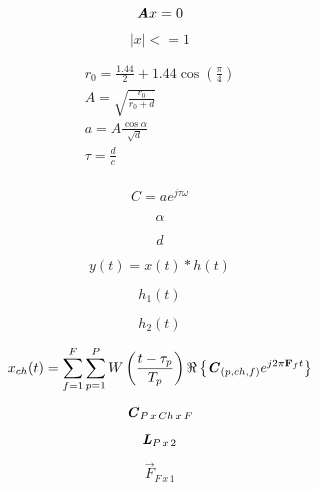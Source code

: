 \documentclass[10pt]{report}
\begin{document}
	
\begin{equation*}
\bm{\mathit{A}}x = 0
\end{equation*}

\begin{equation*}
|x| <= 1
\end{equation*}

\begin{gather*}
	r_0 = \frac{1.44}{2} + 1.44 \cos\left( \frac{\pi}{4} \right)\\
	A = \sqrt{\frac{r_0}{r_0 + d}}\\
	a = A\frac{\cos\alpha}{\sqrt{d}}\\
	\tau = \frac{d}{c}\\
\end{gather*}	

\begin{equation*}
	C = a e^{j\tau \omega}
\end{equation*}

\begin{equation*}
	\alpha
\end{equation*}

\begin{equation*}
	d
\end{equation*}
	
\begin{equation*}
	y(t) = x(t)\ast h(t)
\end{equation*}

\begin{equation*}
	h_1(t)
\end{equation*}

\begin{equation*}
	h_2(t)
\end{equation*}

\begin{equation*}
	x_{ch}(t) = \sum_{f = 1}^{F} \sum_{p = 1}^{P} W\left(\frac{t - \tau_p}{T_p}\right)
	\Re \left\{ \bm{\mathit{C}}_{(p,ch,f)} e^{j 2 \pi \mathbf{F}_f t} \right\}
\end{equation*}

\begin{equation*}
	\bm{\mathit{C}}_{P \, x \, Ch \, x \, F}
\end{equation*}

\begin{equation*}
	\bm{\mathit{L}}_{P \, x \, 2}
\end{equation*}

\begin{equation*}
	\vec{F}_{F \, x \, 1}
\end{equation*}
\end{document}
